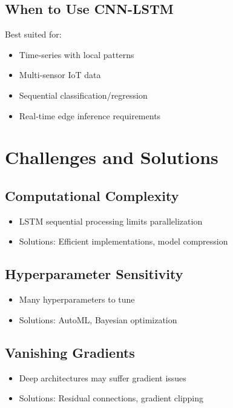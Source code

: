 \documentclass[12pt,a4paper]{article}
\begin{document}
\subsection{When to Use CNN-LSTM}

Best suited for:
\begin{itemize}
    \item Time-series with local patterns
    \item Multi-sensor IoT data
    \item Sequential classification/regression
    \item Real-time edge inference requirements
\end{itemize}

\section{Challenges and Solutions}

\subsection{Computational Complexity}

\begin{itemize}
    \item LSTM sequential processing limits parallelization
    \item Solutions: Efficient implementations, model compression
\end{itemize}

\subsection{Hyperparameter Sensitivity}

\begin{itemize}
    \item Many hyperparameters to tune
    \item Solutions: AutoML, Bayesian optimization
\end{itemize}

\subsection{Vanishing Gradients}

\begin{itemize}
    \item Deep architectures may suffer gradient issues
    \item Solutions: Residual connections, gradient clipping
\end{itemize}
\end{document}
